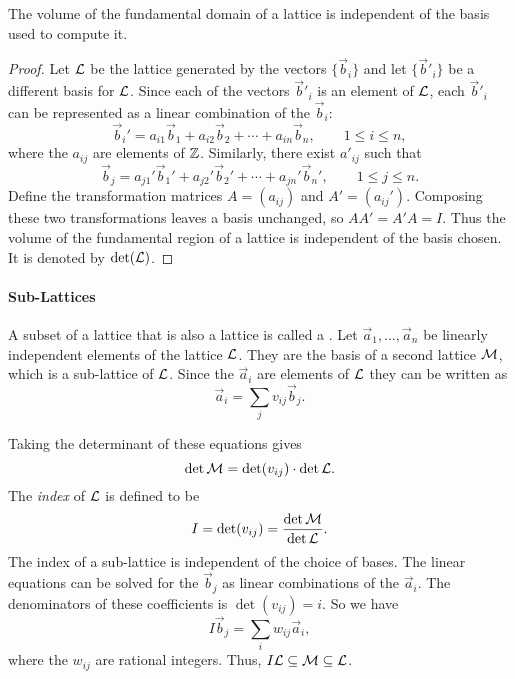 \begin{proposition}
The volume of the fundamental domain of a lattice is independent of
the basis used to compute it.
\end{proposition}

\begin{proof}
Let ${\cal L}$ be the lattice generated by the vectors $\{\vec{b}_i\}$ and
let $\{\vec{b}'_i\}$ be a different basis for ${\cal L}$.  Since each of
the vectors $\vec{b}'_i$ is an element of ${\cal L}$, each $\vec{b}'_i$ can
be represented as a linear combination of the $\vec{b}_i$:
\[
\vec b_{i}' = a_{i1} \vec b_{1} + a_{i2} \vec b_{2} + \cdots + a_{in} \vec b_{n},
\qquad 1 \le i \le n,
\]
where the $a_{ij}$ are elements of $\mathbb{Z}$.  Similarly, there exist
$a'_{ij}$ such that
\[
\vec b_{j} = a_{j1}' \vec b_{1}' + a_{j2}' \vec b_{2}' + \cdots + a_{jn}'
\vec b_{n}',
\qquad 1 \le j \le n.
\]
Define the transformation matrices $A =
(a_{ij})$ and $A' = (a_{ij}')$.
Composing these two transformations leaves a basis unchanged, so $AA'
= A' A = I$.  Thus the volume of the fundamental region of a lattice is 
independent of the basis chosen.  
It is denoted by $\det({\cal L})$.
\end{proof}

\paragraph{Sub-Lattices}

A subset of a lattice that is also a lattice is called a
.  Let $\vec{a}_1, \ldots, \vec{a}_n$ be linearly
independent elements of the lattice ${\cal L}$.  They are the basis of
a second lattice ${\cal M}$, which is a sub-lattice of ${\cal L}$.
Since the $\vec{a}_i$ are elements of ${\cal L}$ they can be written
as
\begin{equation} \label{SubLatt:a:Eq}
\vec{a}_i = \sum_j v_{ij} \vec{b}_j.
\end{equation}

Taking the determinant of these equations gives
\[
\det {\cal M} = \det (v_{ij}) \cdot \det {\cal L}.
\]
The {\em index} of ${\cal L}$ is defined
to be 
\begin{equation} \label{Latt:Index:Eq}
I = \det (v_{ij}) = \frac{\det {\cal M}}{\det {\cal L}}.
\end{equation}
The index of a sub-lattice is independent of the choice of bases.
The linear equations  can be solved for the
$\vec{b}_j$ as linear combinations of the $\vec{a}_i$.  The
denominators of these coefficients is $\det(v_{ij}) = i$.  So we have
\[
I \vec{b}_j = \sum_i w_{ij} \vec{a}_{i},
\]
where the $w_{ij}$ are rational integers.  Thus, $I {\cal L} \subseteq
{\cal M} \subseteq {\cal L}$.

